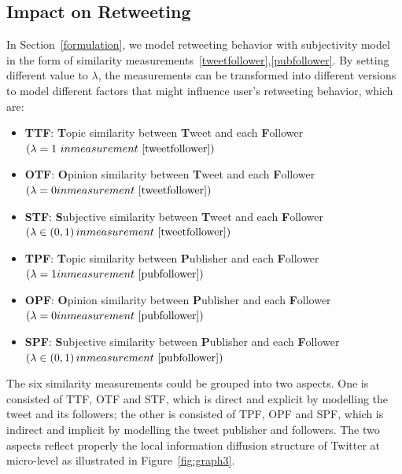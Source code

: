 \documentclass[smallcondensed]{svjour3}     %
\begin{document}
\subsection{Impact on Retweeting}
\label{influence}
In Section~\ref{formulation},  we model retweeting behavior with subjectivity model  in the form of similarity measurements~\ref{tweetfollower},\ref{pubfollower}.
By setting different value to $ \lambda $, the measurements can be transformed into different versions to model different factors that might influence user's retweeting behavior, which are:
\begin{itemize}
\item \textbf{TTF}: \textbf{T}opic similarity between \textbf{T}weet and each \textbf{F}ollower $ \left( \lambda =1  \ in measurement~\ref{tweetfollower} \right) $ 
\item \textbf{OTF}: \textbf{O}pinion similarity between \textbf{T}weet and each \textbf{F}ollower $ \left( \lambda =0  in measurement~\ref{tweetfollower} \right) $
\item \textbf{STF}: \textbf{S}ubjective similarity between \textbf{T}weet and each \textbf{F}ollower $ \left( \lambda \in \left( 0,1 \right)   in measurement~\ref{tweetfollower} \right) $ 
\item \textbf{TPF}: \textbf{T}opic similarity between \textbf{P}ublisher and each \textbf{F}ollower $ \left( \lambda =1   in measurement~\ref{pubfollower}  \right) $ 
\item \textbf{OPF}: \textbf{O}pinion similarity between \textbf{P}ublisher and each \textbf{F}ollower $ \left( \lambda =0  in measurement~\ref{pubfollower} \right) $
\item \textbf{SPF}: \textbf{S}ubjective similarity between \textbf{P}ublisher and each \textbf{F}ollower $ \left( \lambda \in \left( 0,1 \right)   in measurement~\ref{pubfollower} \right) $
\end{itemize}
The six similarity measurements could be grouped into two aspects. 
One is consisted of TTF, OTF and STF, which is direct and explicit by modelling the tweet and its followers;
the other is consisted of TPF, OPF and SPF, which is indirect and implicit by modelling the tweet publisher and followers.
The two aspects reflect properly the local information diffusion structure of Twitter at micro-level as illustrated in Figure~\ref{fig:graph3}.
\end{document}
